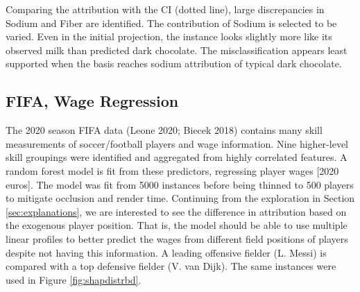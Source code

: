 \documentclass[11pt,twoside]{article}
\begin{document}
Comparing the attribution with the CI (dotted line), large discrepancies in Sodium and Fiber are identified. The contribution of Sodium is selected to be varied. Even in the initial projection, the instance looks slightly more like its observed milk than predicted dark chocolate. The misclassification appears least supported when the basis reaches sodium attribution of typical dark chocolate.

\hypertarget{fifa-wage-regression}{%
\subsection{FIFA, Wage Regression}\label{fifa-wage-regression}}

The 2020 season FIFA data (Leone 2020; Biecek 2018) contains many skill measurements of soccer/football players and wage information. Nine higher-level skill groupings were identified and aggregated from highly correlated features. A random forest model is fit from these predictors, regressing player wages {[}2020 euros{]}. The model was fit from 5000 instances before being thinned to 500 players to mitigate occlusion and render time. Continuing from the exploration in Section \ref{sec:explanations}, we are interested to see the difference in attribution based on the exogenous player position. That is, the model should be able to use multiple linear profiles to better predict the wages from different field positions of players despite not having this information. A leading offensive fielder (L. Messi) is compared with a top defensive fielder (V. van Dijk). The same instances were used in Figure \ref{fig:shapdistrbd}.
\end{document}
